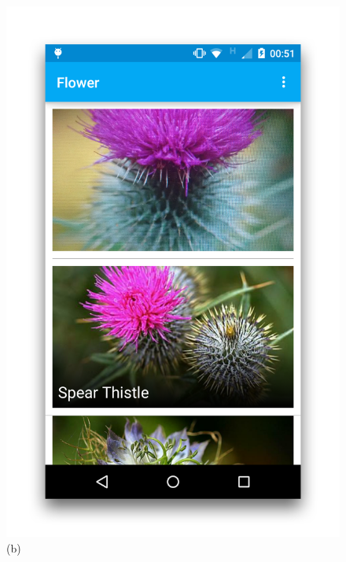\documentclass[11pt, a4paper]{report}
\begin{document}
\begin{figure}[h]
\begin{minipage}[b]{0.2\linewidth}
	\includegraphics[totalheight=6cm]{img/48.png}
	(b)
\end{minipage}
\begin{minipage}[b]{0.2\linewidth}
	\centering

\end{minipage}
\end{figure}
\end{document}
